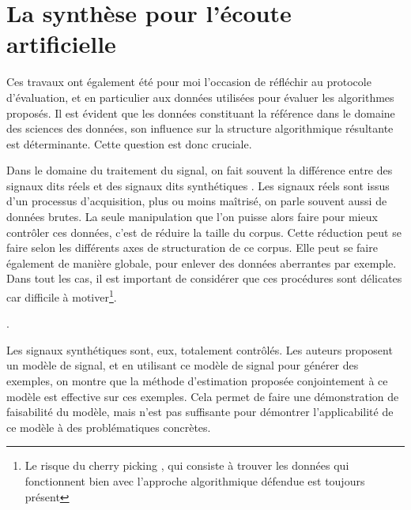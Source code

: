   \section{ \nmu La  synthèse pour l'écoute artificielle} \label{sec:dcase}

  Ces travaux ont également été pour moi l'occasion de réfléchir au protocole d'évaluation, et en particulier aux données utilisées pour évaluer les algorithmes proposés. Il est évident que les données constituant la référence dans le domaine des sciences des données, son influence sur la structure algorithmique résultante est déterminante. Cette question est donc cruciale.

  Dans le domaine du traitement du signal, on fait souvent la différence entre des signaux dits \og réels \fg et des signaux dits \og synthétiques \fg. Les signaux réels sont issus d'un processus d'acquisition, plus ou moins maîtrisé, on parle souvent aussi de données brutes. La seule manipulation que l'on puisse alors faire pour mieux contrôler ces données, c'est de réduire la taille du corpus. Cette réduction peut se faire selon les différents axes de structuration de ce corpus. Elle peut se faire également de manière globale, pour enlever des données aberrantes par exemple. Dans tout les cas, il est important de considérer que ces procédures sont délicates car difficile à motiver\footnote{Le risque du \og cherry picking \fg, qui consiste à trouver les données qui fonctionnent bien avec l'approche algorithmique défendue est toujours présent}.

  .


  Les signaux synthétiques sont, eux, totalement contrôlés. Les auteurs proposent un modèle de signal, et en utilisant ce modèle de signal pour générer des exemples, on montre que la méthode d'estimation proposée conjointement à ce modèle est effective sur ces exemples. Cela permet de faire une démonstration de faisabilité du modèle, mais n'est pas suffisante pour démontrer l'applicabilité de ce modèle à des problématiques concrètes.

